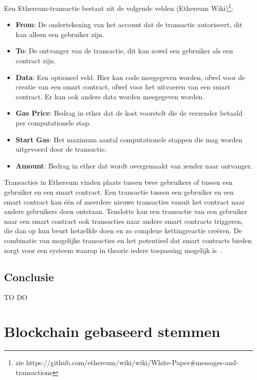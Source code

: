 		Een Ethereum-transactie bestaat uit de volgende velden (Ethereum Wiki)\footnote{zie https://github.com/ethereum/wiki/wiki/White-Paper\#messages-and-transactions}:
		\begin{itemize}
			\item \textbf{From}: De ondertekening van het account dat de transactie autoriseert, dit kan alleen een gebruiker zijn.
			\item \textbf{To}: De ontvanger van de transactie, dit kan zowel een gebruiker als een contract zijn. 
			\item \textbf{Data}: Een optioneel veld. Hier  kan code meegegeven worden, ofwel voor de creatie van een smart contract, ofwel voor het uitvoeren van een smart contract.
Er kan ook andere data worden meegegeven worden.
			\item \textbf{Gas Price}: Bedrag in ether dat de kost voorstelt die de verzender betaald per computationele stap.
			\item \textbf{Start Gas}: Het maximum aantal computationele stappen die mag worden uitgevoerd door de transactie.
			\item \textbf{Amount}: Bedrag in ether dat wordt overgemaakt van zender naar ontvanger.
		\end{itemize}	
		Transacties in Ethereum vinden plaats tussen twee gebruikers of tussen een gebruiker en een smart contract. Een transactie tussen een gebruiker en een smart contract kan één of meerdere nieuwe transacties vanuit het contract naar andere gebruikers doen ontstaan. Tenslotte kan een transactie van een gebruiker naar een smart contract ook transacties naar andere smart contracts triggeren, die dan op hun beurt hetzelfde doen en zo complexe kettingreactie creëren. De combinatie van mogelijke transacties en het potentieel dat smart contracts bieden zorgt voor een systeem waarop in theorie iedere toepassing mogelijk is~\autocite{Wood2017}. 
	\subsection{Conclusie}
		TO DO
\section{Blockchain gebaseerd stemmen}
\label{sec:blockchain-gebaseerd-stemmen}
